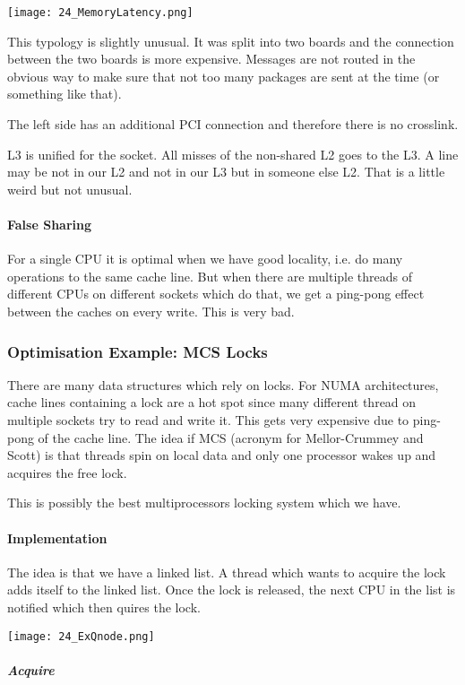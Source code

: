 \texttt{[image: 24\_MemoryLatency.png]}


This typology is slightly unusual. It was split into two boards and the connection between the two boards is more expensive. Messages are not routed in the obvious way to make sure that not too many packages are sent at the time (or something like that). 

The left side has an additional PCI connection and therefore there is no crosslink. 

L3 is unified for the socket. All misses of the non-shared L2 goes to the L3. A line may be not in our L2 and not in our L3 but in someone else L2. That is a little weird but not unusual. 

\paragraph{False Sharing}
For a single CPU it is optimal when we have good locality, i.e. do many operations to the same cache line. But when there are multiple threads of different CPUs on different sockets which do that, we get a ping-pong effect between the caches on every write. This is very bad.

\subsubsection{Optimisation Example: MCS Locks}
There are many data structures which rely on locks. For NUMA architectures, cache lines containing a lock are a hot spot since many different thread on multiple sockets try to read and write it. This gets very expensive due to ping-pong of the cache line. The idea if MCS (acronym for Mellor-Crummey and Scott) is that threads spin on local data and only one processor wakes up and acquires the free lock.

This is possibly the best multiprocessors locking system which we have.

\paragraph{Implementation}
The idea is that we have a linked list. A thread which wants to acquire the lock adds itself to the linked list. Once the lock is released, the next CPU in the list is notified which then quires the lock.

\texttt{[image: 24\_ExQnode.png]}

\subparagraph{Acquire}

